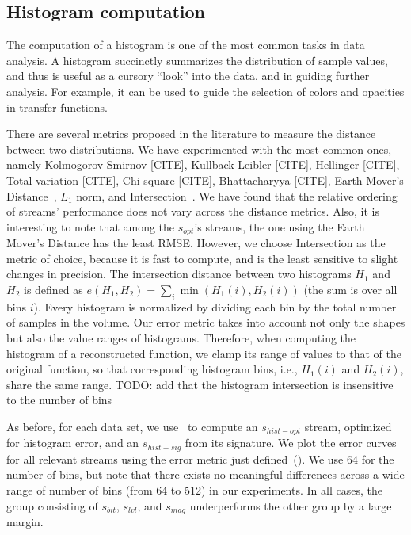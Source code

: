 \subsection{Histogram computation}\label{sec:histogram}

The computation of a histogram is one of the most common tasks in data analysis. A histogram
succinctly summarizes the distribution of sample values, and thus is useful as a cursory ``look''
into the data, and in guiding further analysis. For example, it can be used to guide the selection
of colors and opacities in transfer functions.

There are several metrics proposed in the literature to measure the distance between two
distributions. We have experimented with the most common ones, namely Kolmogorov-Smirnov [CITE],
Kullback-Leibler [CITE], Hellinger [CITE], Total variation [CITE], Chi-square [CITE], Bhattacharyya
[CITE], Earth Mover's Distance~\cite{emd1998}, $L_1$ norm, and
Intersection~\cite{histogram_intersection1991}. We have found that the relative ordering of streams'
performance does not vary across the distance metrics. Also, it is interesting to note that among
the $s_{opt}$'s streams, the one using the Earth Mover's Distance has the least RMSE. However, we choose Intersection as the
metric of choice, because it is fast to compute, and is the least sensitive to slight changes in
precision. The intersection distance between two histograms $H_1$ and $H_2$ is defined as
$e(H_1,H_2)=\sum_{i}{\min{(H_1(i),H_2(i))}}$ (the sum is over all bins $i$). Every histogram is
normalized by dividing each bin by the total number of samples in the volume. Our error metric takes
into account not only the shapes but also the value ranges of histograms. Therefore, when computing
the histogram of a reconstructed function, we clamp its range of values to that of the original
function, so that corresponding histogram bins, i.e., $H_1(i)$ and $H_2(i)$, share the same range.
TODO: add that the histogram intersection is insensitive to the number of bins

As before, for each data set, we use~ to compute an $s_{hist-opt}$ stream,
optimized for histogram error, and an $s_{hist-sig}$ from its signature. We plot the error curves
for all relevant streams using the error metric just
defined~(). We use 64 for the number of bins, but note that
there exists no meaningful differences across a wide range of number of bins (from 64 to 512) in our
experiments. In all cases, the group consisting of $s_{bit}$, $s_{lvl}$, and $s_{mag}$ underperforms
the other group by a large margin.

